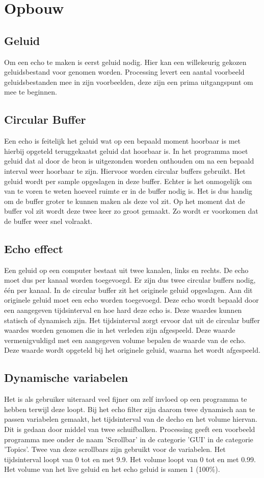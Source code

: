 \documentclass[a4paper]{article}
\begin{document}
	\section{Opbouw}
	\subsection{Geluid}
		Om een echo te maken is eerst geluid nodig. Hier kan een willekeurig gekozen geluidsbestand voor genomen worden. Processing levert een aantal voorbeeld geluidsbestanden mee in zijn voorbeelden, deze zijn een prima uitgangspunt om mee te beginnen.
	\subsection{Circular Buffer}
		Een echo is feitelijk het geluid wat op een bepaald moment hoorbaar is met hierbij opgeteld teruggekaatst geluid dat hoorbaar is. In het programma moet geluid dat al door de bron is uitgezonden worden onthouden om na een bepaald interval weer hoorbaar te zijn. Hiervoor worden circular buffers gebruikt. Het geluid wordt per sample opgeslagen in deze buffer. Echter is het onmogelijk om van te voren te weten hoeveel ruimte er in de buffer nodig is. Het is dus handig om de buffer groter te kunnen maken als deze vol zit. Op het moment dat de buffer vol zit wordt deze twee keer zo groot gemaakt. Zo wordt er voorkomen dat de buffer weer snel volraakt.
	\subsection{Echo effect}
		Een geluid op een computer bestaat uit twee kanalen, links en rechts. De echo moet dus per kanaal worden toegevoegd. Er zijn dus twee circular buffers nodig, \'e\'en per kanaal. In de circular buffer zit het originele geluid opgeslagen. Aan dit originele geluid moet een echo worden toegevoegd. Deze echo wordt bepaald door een aangegeven tijdsinterval en hoe hard deze echo is. Deze waardes kunnen statisch of dynamisch zijn. Het tijdsinterval zorgt ervoor dat uit de circular buffer waardes worden genomen die in het verleden zijn afgespeeld. Deze waarde vermenigvuldigd met een aangegeven volume bepalen de waarde van de echo. Deze waarde wordt opgeteld bij het originele geluid, waarna het wordt afgespeeld.
	\subsection{Dynamische variabelen}
		Het is als gebruiker uiteraard veel fijner om zelf invloed op een programma te hebben terwijl deze loopt. Bij het echo filter zijn daarom twee dynamisch aan te passen variabelen gemaakt, het tijdsinterval van de decho en het volume hiervan. Dit is gedaan door middel van twee schuifbalken. Processing geeft een voorbeeld programma mee onder de naam 'Scrollbar' in de categorie 'GUI' in de categorie 'Topics'. Twee van deze scrollbars zijn gebruikt voor de variabelen. Het tijdsinterval loopt van 0 tot en met 9.9. Het volume loopt van 0 tot en met 0.99. Het volume van het live geluid en het echo geluid is samen 1 (100\%).
\end{document}
